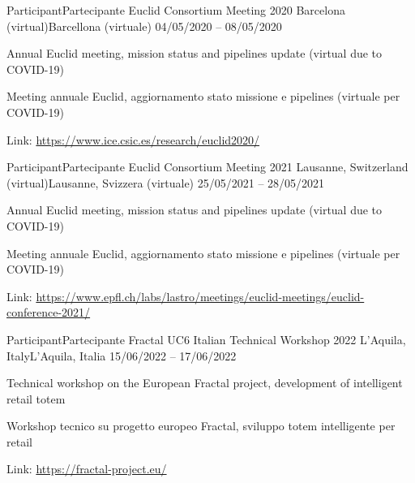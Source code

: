 \begin{cventries}

\cventry
{\ifenglish Participant\else Partecipante\fi} %
{Euclid Consortium Meeting 2020} %
{\ifenglish Barcelona (virtual)\else Barcellona (virtuale)\fi} %
{04/05/2020 -- 08/05/2020} %
{ %
\begin{cvitems}
\ifenglish
\item {Annual Euclid meeting, mission status and pipelines update (virtual due to COVID-19)}
\else
\item {Meeting annuale Euclid, aggiornamento stato missione e pipelines (virtuale per COVID-19)}
\fi
\item {Link: \url{https://www.ice.csic.es/research/euclid2020/}}
\end{cvitems}
}


\cventry
{\ifenglish Participant\else Partecipante\fi} %
{Euclid Consortium Meeting 2021} %
{\ifenglish Lausanne, Switzerland (virtual)\else Lausanne, Svizzera (virtuale)\fi} %
{25/05/2021 -- 28/05/2021} %
{ %
\begin{cvitems}
\ifenglish
\item {Annual Euclid meeting, mission status and pipelines update (virtual due to COVID-19)}
\else
\item {Meeting annuale Euclid, aggiornamento stato missione e pipelines (virtuale per COVID-19)}
\fi
\item {Link: \url{https://www.epfl.ch/labs/lastro/meetings/euclid-meetings/euclid-conference-2021/}}
\end{cvitems}
}


\cventry
{\ifenglish Participant\else Partecipante\fi} %
{Fractal UC6 Italian Technical Workshop 2022} %
{\ifenglish L'Aquila, Italy\else L'Aquila, Italia\fi} %
{15/06/2022 -- 17/06/2022} %
{ %
\begin{cvitems}
\ifenglish
\item {Technical workshop on the European Fractal project, development of intelligent retail totem}
\else
\item {Workshop tecnico su progetto europeo Fractal, sviluppo totem intelligente per retail}
\fi
\item {Link: \url{https://fractal-project.eu/}}
\end{cvitems}
}


\end{cventries}
